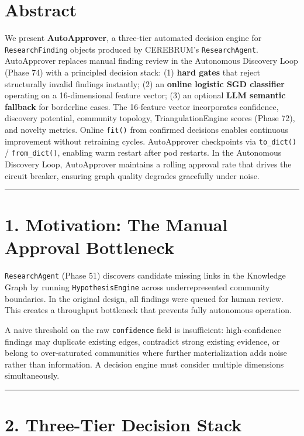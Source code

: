 
\section*{Abstract}

We present \textbf{AutoApprover}, a three-tier automated decision engine for \texttt{ResearchFinding} objects produced by CEREBRUM's \texttt{ResearchAgent}. AutoApprover replaces manual finding review in the Autonomous Discovery Loop (Phase 74) with a principled decision stack: (1) \textbf{hard gates} that reject structurally invalid findings instantly; (2) an \textbf{online logistic SGD classifier} operating on a 16-dimensional feature vector; (3) an optional \textbf{LLM semantic fallback} for borderline cases. The 16-feature vector incorporates confidence, discovery potential, community topology, TriangulationEngine scores (Phase 72), and novelty metrics. Online \texttt{fit()} from confirmed decisions enables continuous improvement without retraining cycles. AutoApprover checkpoints via \texttt{to\_dict()} / \texttt{from\_dict()}, enabling warm restart after pod restarts. In the Autonomous Discovery Loop, AutoApprover maintains a rolling approval rate that drives the circuit breaker, ensuring graph quality degrades gracefully under noise.

\medskip\noindent\rule{\linewidth}{0.4pt}\medskip

\section*{1. Motivation: The Manual Approval Bottleneck}

\texttt{ResearchAgent} (Phase 51) discovers candidate missing links in the Knowledge Graph by running \texttt{HypothesisEngine} across underrepresented community boundaries. In the original design, all findings were queued for human review. This creates a throughput bottleneck that prevents fully autonomous operation.

A naive threshold on the raw \texttt{confidence} field is insufficient: high-confidence findings may duplicate existing edges, contradict strong existing evidence, or belong to over-saturated communities where further materialization adds noise rather than information. A decision engine must consider multiple dimensions simultaneously.

\medskip\noindent\rule{\linewidth}{0.4pt}\medskip

\section*{2. Three-Tier Decision Stack}


